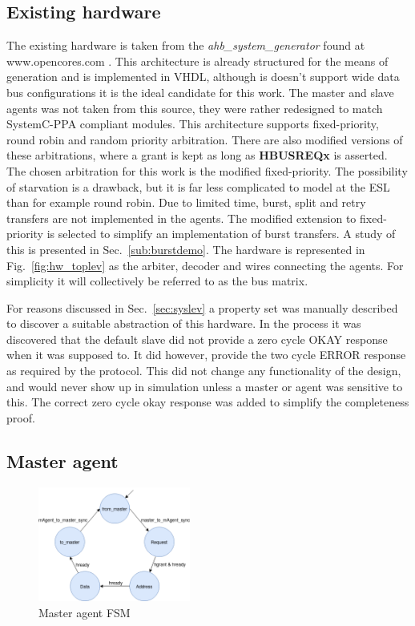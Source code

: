 \subsection{Existing hardware}
\label{sub:exist}
The existing hardware is taken from the \textit{ahb\_system\_generator} found at \\
 www.opencores.com \cite{ahbsys}. This architecture is already structured for the means of generation and is implemented in VHDL, although is doesn't support wide data bus configurations it is the ideal candidate for this work. The master and slave agents was not taken from this source, they were rather redesigned to match SystemC-PPA compliant modules. This architecture supports fixed-priority, round robin and random priority arbitration. There are also modified versions of these arbitrations, where a grant is kept as long as \textbf{HBUSREQx} is asserted. The chosen arbitration for this work is the modified fixed-priority. The possibility of starvation is a drawback, but it is far less complicated to model at the ESL than for example round robin. Due to limited time, burst, split and retry transfers are not implemented in the agents. The modified extension to fixed-priority is selected to simplify an implementation of burst transfers. A study of this is presented in Sec.~\ref{sub:burstdemo}. The hardware is represented in Fig.~\ref{fig:hw_toplev} as the arbiter, decoder and wires connecting the agents. For simplicity it will collectively be referred to as the bus matrix. \par 
For reasons discussed in Sec.~\ref{sec:syslev} a property set was manually described to discover a suitable abstraction of this hardware. In the process it was
discovered that the default slave did not provide a zero cycle OKAY response when it was supposed to. It did however, provide the two cycle ERROR response as 
required by the protocol. This did not change any functionality of the design, and would never show up in simulation unless a master or agent was sensitive to this. The correct zero cycle okay response was added to simplify the completeness proof. 

   
\subsection{Master agent}
\begin{figure}
\includegraphics[width=5cm]{figs/hw/mAgent_FSM.png}
\caption{Master agent FSM}\label{fig:rafsm}
\end{figure}  

